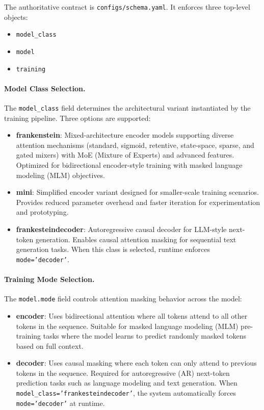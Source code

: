 \documentclass[11pt,a4paper]{article}
\begin{document}
The authoritative contract is \texttt{configs/schema.yaml}. It enforces three top-level objects:
\begin{itemize}[leftmargin=*]
    \item \texttt{model\_class}
    \item \texttt{model}
    \item \texttt{training}
\end{itemize}

\paragraph{Model Class Selection.}
The \texttt{model\_class} field determines the architectural variant instantiated by the training pipeline. Three options are supported:
\begin{itemize}[leftmargin=*]
    \item \textbf{frankenstein}: Mixed-architecture encoder models supporting diverse attention mechanisms (standard, sigmoid, retentive, state-space, sparse, and gated mixers) with MoE (Mixture of Experts) and advanced features. Optimized for bidirectional encoder-style training with masked language modeling (MLM) objectives.
    \item \textbf{mini}: Simplified encoder variant designed for smaller-scale training scenarios. Provides reduced parameter overhead and faster iteration for experimentation and prototyping.
    \item \textbf{frankesteindecoder}: Autoregressive causal decoder for LLM-style next-token generation. Enables causal attention masking for sequential text generation tasks. When this class is selected, runtime enforces \texttt{mode='decoder'}. 
\end{itemize}

\paragraph{Training Mode Selection.}
The \texttt{model.mode} field controls attention masking behavior across the model:
\begin{itemize}[leftmargin=*]
    \item \textbf{encoder}: Uses bidirectional attention where all tokens attend to all other tokens in the sequence. Suitable for masked language modeling (MLM) pre-training tasks where the model learns to predict randomly masked tokens based on full context.
    \item \textbf{decoder}: Uses causal masking where each token can only attend to previous tokens in the sequence. Required for autoregressive (AR) next-token prediction tasks such as language modeling and text generation. When \texttt{model\_class='frankesteindecoder'}, the system automatically forces \texttt{mode='decoder'} at runtime.
\end{itemize}
\end{document}
